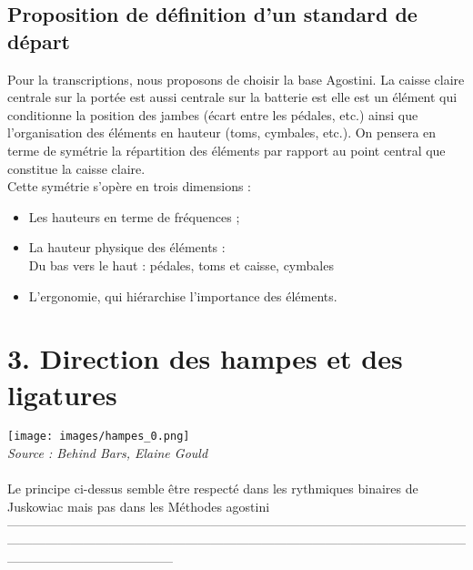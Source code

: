 \subsection*{Proposition de définition d’un standard de départ}
Pour la transcriptions, nous proposons de choisir la base Agostini. La caisse claire centrale sur la portée est aussi centrale sur la batterie est elle est un élément qui conditionne la position des jambes (écart entre les pédales, etc.) ainsi que l’organisation des éléments en hauteur (toms, cymbales, etc.).
On pensera en terme de symétrie la répartition des éléments par rapport au point central que constitue la caisse claire.\\
Cette symétrie s’opère en trois dimensions :
\begin{itemize}
	\item Les hauteurs en terme de fréquences ;
	\item La hauteur physique des éléments :\\
	Du bas vers le haut : pédales, toms et caisse, cymbales
	\item L’ergonomie, qui hiérarchise l’importance des éléments.
\end{itemize}
\section*{3. Direction des hampes et des ligatures}
\texttt{[image: images/hampes\_0.png]} \\\textit{Source : Behind Bars, Elaine Gould}\\\\
Le principe ci-dessus semble être respecté dans les rythmiques binaires de Juskowiac mais pas dans les Méthodes agostini\\
—————————————————————————————————————————————————————————————————————————————————————